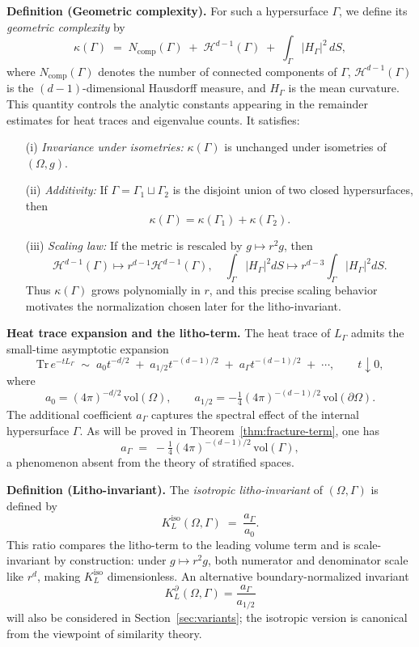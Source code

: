 \medskip
\noindent
\textbf{Definition (Geometric complexity).}
For such a hypersurface $\Gamma$, we define its \emph{geometric complexity} by
\[
\kappa(\Gamma) \;=\; N_{\mathrm{comp}}(\Gamma) \;+\; \mathcal{H}^{d-1}(\Gamma) 
\;+\; \int_\Gamma |H_\Gamma|^2 \, dS,
\]
where $N_{\mathrm{comp}}(\Gamma)$ denotes the number of connected components of $\Gamma$, 
$\mathcal{H}^{d-1}(\Gamma)$ is the $(d-1)$-dimensional Hausdorff measure, and 
$H_\Gamma$ is the mean curvature. This quantity controls the analytic constants appearing in the remainder estimates for heat traces and eigenvalue counts. It satisfies:
\begin{itemize}
\item[(i)] \emph{Invariance under isometries:} $\kappa(\Gamma)$ is unchanged under isometries of $(\Omega,g)$.
\item[(ii)] \emph{Additivity:} If $\Gamma = \Gamma_1 \sqcup \Gamma_2$ is the disjoint union of two closed hypersurfaces, then 
\[
\kappa(\Gamma) = \kappa(\Gamma_1) + \kappa(\Gamma_2).
\]
\item[(iii)] \emph{Scaling law:} If the metric is rescaled by $g \mapsto r^2 g$, then
\[
\mathcal{H}^{d-1}(\Gamma) \mapsto r^{d-1}\mathcal{H}^{d-1}(\Gamma), 
\quad 
\int_\Gamma |H_\Gamma|^2 dS \mapsto r^{d-3}\int_\Gamma |H_\Gamma|^2 dS.
\]
Thus $\kappa(\Gamma)$ grows polynomially in $r$, and this precise scaling behavior motivates the normalization chosen later for the litho-invariant.
\end{itemize}

\medskip
\noindent
\textbf{Heat trace expansion and the litho-term.}
The heat trace of $L_\Gamma$ admits the small-time asymptotic expansion
\[
\mathrm{Tr}\, e^{-tL_\Gamma} \;\sim\; a_0 t^{-d/2} \;+\; a_{1/2} t^{-(d-1)/2} 
\;+\; a_\Gamma t^{-(d-1)/2} \;+\; \cdots, 
\qquad t \downarrow 0,
\]
where
\[
a_0 = (4\pi)^{-d/2}\, \mathrm{vol}(\Omega), 
\qquad 
a_{1/2} = -\tfrac{1}{4}(4\pi)^{-(d-1)/2}\, \mathrm{vol}(\partial\Omega).
\]
The additional coefficient $a_\Gamma$ captures the spectral effect of the internal hypersurface $\Gamma$. As will be proved in Theorem~\ref{thm:fracture-term}, one has
\[
a_\Gamma \;=\; -\tfrac{1}{4}(4\pi)^{-(d-1)/2}\, \mathrm{vol}(\Gamma),
\]
a phenomenon absent from the theory of stratified spaces.

\medskip
\noindent
\textbf{Definition (Litho-invariant).}
The \emph{isotropic litho-invariant} of $(\Omega,\Gamma)$ is defined by
\[
K_L^{\mathrm{iso}}(\Omega,\Gamma) \;=\; \frac{a_\Gamma}{a_0}.
\]
This ratio compares the litho-term to the leading volume term and is scale-invariant by construction: under $g \mapsto r^2 g$, both numerator and denominator scale like $r^d$, making $K_L^{\mathrm{iso}}$ dimensionless. An alternative boundary-normalized invariant 
\[
K_L^{\partial}(\Omega,\Gamma) = \frac{a_\Gamma}{a_{1/2}}
\]
will also be considered in Section~\ref{sec:variants}; the isotropic version is canonical from the viewpoint of similarity theory.

